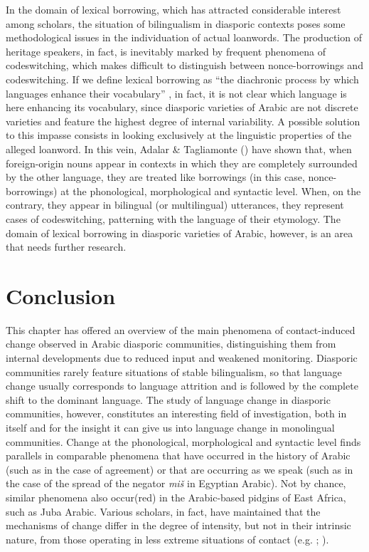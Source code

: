 \documentclass[output=paper]{langsci/langscibook}
\begin{document}
In the domain of lexical borrowing, which has attracted considerable interest among scholars, the situation of bilingualism in diasporic contexts poses some methodological issues in the individuation of actual loanwords. The production of heritage speakers, in fact, is inevitably marked by frequent phenomena of codeswitching, which makes difficult to distinguish between nonce-borrowings \citep{Poplack1980} and codeswitching. If we define lexical borrowing as “the diachronic process by which languages enhance their vocabulary” \citep[106]{Matras2009}, in fact, it is not clear which language is here enhancing its vocabulary, since diasporic varieties of Arabic are not discrete varieties and feature the highest degree of internal variability. A possible solution to this impasse consists in looking exclusively at the linguistic properties of the alleged loanword. In this vein, Adalar \& Tagliamonte (\citeyear[156]{AdalarTagliamonte1998}) have shown that, when foreign-origin nouns appear in contexts in which they are completely surrounded by the other language, they are treated like borrowings (in this case, nonce-borrowings) at the phonological, morphological and syntactic level. When, on the contrary, they appear in bilingual (or multilingual) utterances, they represent cases of codeswitching, patterning with the language of their etymology. The domain of lexical borrowing in diasporic varieties of Arabic, however, is an area that needs further research.

\section{Conclusion}

This chapter has offered an overview of the main phenomena of contact-induced change observed in Arabic diasporic communities, distinguishing them from internal developments due to reduced input and weakened monitoring. Diasporic communities rarely feature situations of stable bilingualism, so that language change usually corresponds to language attrition and is followed by the complete shift to the dominant language. The study of language change in diasporic communities, however, constitutes an interesting field of investigation, both in itself and for the insight it can give us into language change in monolingual communities. Change at the phonological, morphological and syntactic level finds parallels in comparable phenomena that have occurred in the history of Arabic (such as in the case of agreement) or that are occurring as we speak (such as in the case of the spread of the negator \textit{miš} in Egyptian Arabic). Not by chance, similar phenomena also occur(red) in the Arabic-based pidgins of East Africa, such as Juba Arabic. Various scholars, in fact, have maintained that the mechanisms of change differ in the degree of intensity, but not in their intrinsic nature, from those operating in less extreme situations of contact (e.g. \citealt[8]{Miller2003}; \citealt[528]{Lucas2015}).
\end{document}
